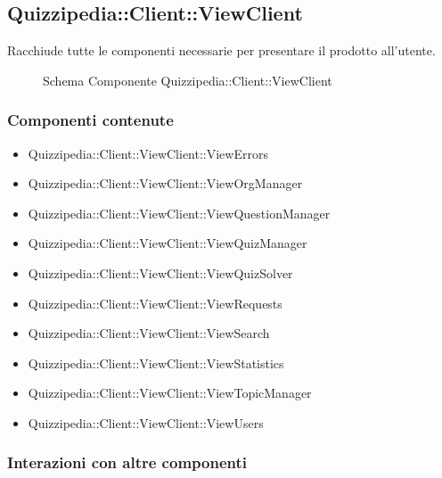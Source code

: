 \subsection{Quizzipedia::Client::ViewClient}
Racchiude tutte le componenti necessarie per presentare il prodotto all'utente.
\begin{figure}[H]
\centering
\noindent{}
\caption[Schema Componente Quizzipedia::Client::ViewClient]{Schema Componente Quizzipedia::Client::ViewClient}
\end{figure}
\subsubsection{Componenti contenute}
\begin{itemize}
\item Quizzipedia::Client::ViewClient::ViewErrors
\item Quizzipedia::Client::ViewClient::ViewOrgManager
\item Quizzipedia::Client::ViewClient::ViewQuestionManager
\item Quizzipedia::Client::ViewClient::ViewQuizManager
\item Quizzipedia::Client::ViewClient::ViewQuizSolver
\item Quizzipedia::Client::ViewClient::ViewRequests
\item Quizzipedia::Client::ViewClient::ViewSearch
\item Quizzipedia::Client::ViewClient::ViewStatistics
\item Quizzipedia::Client::ViewClient::ViewTopicManager
\item Quizzipedia::Client::ViewClient::ViewUsers
\end{itemize}
\subsubsection{Interazioni con altre componenti}
